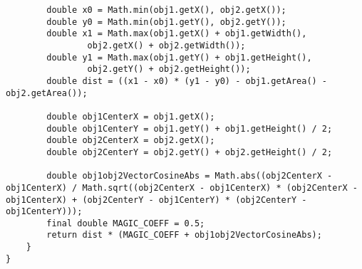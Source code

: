 \begin{appendix}
\begin{lstlisting}
        double x0 = Math.min(obj1.getX(), obj2.getX());
        double y0 = Math.min(obj1.getY(), obj2.getY());
        double x1 = Math.max(obj1.getX() + obj1.getWidth(),
                obj2.getX() + obj2.getWidth());
        double y1 = Math.max(obj1.getY() + obj1.getHeight(),
                obj2.getY() + obj2.getHeight());
        double dist = ((x1 - x0) * (y1 - y0) - obj1.getArea() - obj2.getArea());

        double obj1CenterX = obj1.getX();
        double obj1CenterY = obj1.getY() + obj1.getHeight() / 2;
        double obj2CenterX = obj2.getX();
        double obj2CenterY = obj2.getY() + obj2.getHeight() / 2;

        double obj1obj2VectorCosineAbs = Math.abs((obj2CenterX - obj1CenterX) / Math.sqrt((obj2CenterX - obj1CenterX) * (obj2CenterX - obj1CenterX) + (obj2CenterY - obj1CenterY) * (obj2CenterY - obj1CenterY)));
        final double MAGIC_COEFF = 0.5;
        return dist * (MAGIC_COEFF + obj1obj2VectorCosineAbs);
    }
}
\end{lstlisting}

\end{appendix}